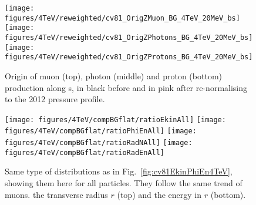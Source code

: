 \newpage



   


\begin{figure}
  
\begin{center}
  \texttt{[image: figures/4TeV/reweighted/cv81\_OrigZMuon\_BG\_4TeV\_20MeV\_bs]}
  \texttt{[image: figures/4TeV/reweighted/cv81\_OrigZPhotons\_BG\_4TeV\_20MeV\_bs]}
  \texttt{[image: figures/4TeV/reweighted/cv81\_OrigZProtons\_BG\_4TeV\_20MeV\_bs]}
\end{center}
\vspace{-0.6cm}
 \caption{Origin of muon (top), photon (middle) and proton (bottom) production along s, in black before and in pink after re-normalising to the 2012 pressure profile. 
  \label{fig:OrigZ4TeV2}}
\end{figure}

\begin{figure}
\begin{center}
   \texttt{[image: figures/4TeV/compBGflat/ratioEkinAll]}
   \texttt{[image: figures/4TeV/compBGflat/ratioPhiEnAll]}
  \texttt{[image: figures/4TeV/compBGflat/ratioRadNAll]}
  \texttt{[image: figures/4TeV/compBGflat/ratioRadEnAll]}
\end{center}
\vspace{-0.6cm}
 \caption{Same type of distributions as in Fig.~\ref{fig:cv81EkinPhiEn4TeV}, showing them here for all particles. They follow the same trend of muons. the transverse radius $r$ (top) and the energy in $r$ (bottom). 
  \label{fig:cv81EkinPhiEn4TeV2}} 
\end{figure}


